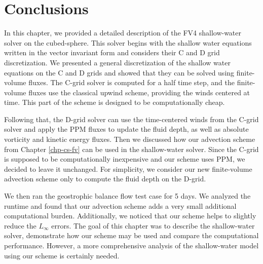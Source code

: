 \section{Conclusions}
\label{sec:conclusions}
In this chapter, we provided a detailed description of the FV4 shallow-water solver on the cubed-sphere. 
This solver begins with the shallow water equations written in the vector invariant form and considers their C and D grid discretization.
We presented a general discretization of the shallow water equations on the C and D grids and showed that they can be solved using finite-volume fluxes.
The C-grid solver is computed for a half time step, and the finite-volume fluxes use the classical upwind scheme, providing the winds centered at time.
This part of the scheme is designed to be computationally cheap.

Following that, the D-grid solver can use the time-centered winds from the C-grid solver and apply the PPM fluxes to update the fluid depth,
as well as absolute vorticity and kinetic energy fluxes. 
Then we discussed how our advection scheme from Chapter \ref{chp-cs-fv} can be used in the shallow-water solver. 
Since the C-grid is supposed to be computationally inexpensive and our scheme uses PPM, we decided to leave it unchanged. 
For simplicity, we consider our new finite-volume advection scheme only to compute the fluid depth on the D-grid.

We then ran the geostrophic balance flow test case for 5 days. 
We analyzed the runtime and found that our advection scheme adds a very small additional computational burden.
Additionally, we noticed that our scheme helps to slightly reduce the $L_{\infty}$ errors.
The goal of this chapter was to describe the shallow-water solver, demonstrate how our scheme may be used and compare the computational performance.
However, a more comprehensive analysis of the shallow-water model using our scheme is certainly needed.